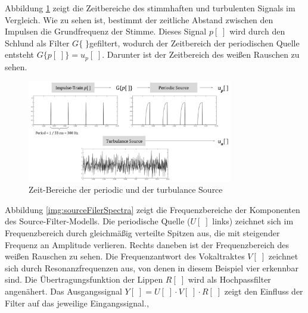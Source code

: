 Abbildung \ref{img:glottalSource} zeigt die Zeitbereiche des stimmhaften und turbulenten Signals im Vergleich. Wie zu sehen ist, bestimmt der zeitliche Abstand zwischen den Impulsen die Grundfrequenz der Stimme. Dieses Signal $p[\;]$ wird durch den Schlund als Filter $G\{ \; \}$gefiltert, wodurch der Zeitbereich der periodischen Quelle entsteht $G\{p[\;]\} = u_p[\;]$. Darunter ist der Zeitbereich des weißen Rauschen zu sehen. \cite[Source]{speechAcoustics}

\begin{figure}[h]
	\centering
	\includegraphics[width=0.8\textwidth]{bilder/glottalSource.png}
	\caption{Zeit-Bereiche der periodic und der turbulance Source \cite[Source]{speechAcoustics}}
	\label{img:glottalSource}
\end{figure}	

Abbildung \ref{img:sourceFilerSpectra} zeigt die Frequenzbereiche der Komponenten des Source-Filter-Modells. Die periodische Quelle ($U[\;]$ links) zeichnet sich im Frequenzbereich durch gleichmäßig verteilte Spitzen aus, die mit steigender Frequenz an Amplitude verlieren. Rechts daneben ist der Frequenzbereich des weißen Rauschen zu sehen. Die Frequenzantwort des Vokaltraktes $V[\;]$ zeichnet sich durch Resonanzfrequenzen aus, von denen in diesem Beispiel vier  erkennbar sind. Die Übertragungsfunktion der Lippen $R[\;]$ wird als Hochpassfilter angenähert. Das Ausgangssignal $Y[\;] = U[\;] \cdot V[\;] \cdot R[\;]$ zeigt den Einfluss der Filter auf das jeweilige Eingangssignal.\cite[Source estimation]{ricardo_ceps}, \cite[Vocal Tract Resonance]{speechAcoustics}


